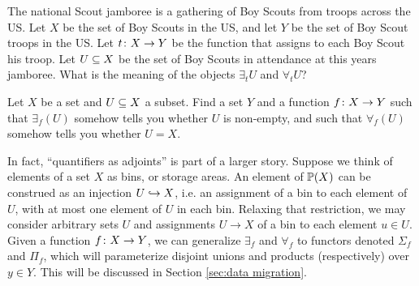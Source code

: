\documentclass[CT4S-EN-RU]{subfiles}
\begin{document}
\begin{exampleRUS}
\end{exampleRUS}

\begin{exerciseENG}
The national Scout jamboree is a gathering of Boy Scouts from troops across the US. Let $X$ be the set of Boy Scouts in the US, and let $Y$ be the set of Boy Scout troops in the US. Let $t\taking X\to Y$ be the function that assigns to each Boy Scout his troop. Let $U\ss X$ be the set of Boy Scouts in attendance at this years jamboree. What is the meaning of the objects $\exists_tU$ and $\forall_tU$?
\end{exerciseENG}

\begin{exerciseRUS}
\end{exerciseRUS}

\begin{exerciseENG}
Let $X$ be a set and $U\ss X$ a subset. Find a set $Y$ and a function $f\taking X\to Y$ such that $\exists_f(U)$ somehow tells you whether $U$ is non-empty, and such that $\forall_f(U)$ somehow tells you whether $U=X$.
\end{exerciseENG}

\begin{exerciseRUS}
\end{exerciseRUS}

\begin{blockENG}
In fact, “quantifiers as adjoints” is part of a larger story. Suppose we think of elements of a set $X$ as bins, or storage areas. An element of $\PP(X)$ can be construed as an injection $U\inj X$, i.e. an assignment of a bin to each element of $U$, with at most one element of $U$ in each bin. Relaxing that restriction, we may consider arbitrary sets $U$ and assignments $U\to X$ of a bin to each element $u\in U$. Given a function $f\taking X\to Y$, we can generalize $\exists_f$ and $\forall_f$ to functors denoted $\Sigma_f$ and $\Pi_f$, which will parameterize disjoint unions and products (respectively) over $y\in Y$. This will be discussed in Section \ref{sec:data migration}.
\end{blockENG}

\begin{blockRUS}
\end{blockRUS}


\subsection{}\label{sec:universal concepts}
\end{document}
